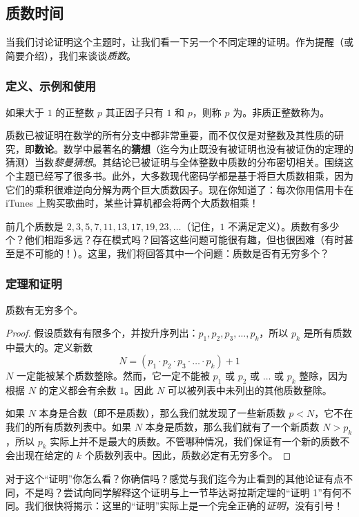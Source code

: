 \subsection{质数时间}\label{sec:section1.1.2}

当我们讨论证明这个主题时，让我们看一下另一个不同定理的证明。作为提醒（或简要介绍），我们来谈谈\emph{质数}。

\subsubsection*{定义、示例和使用}

\begin{definition}\label{def:prime}
    如果大于 $1$ 的正整数 $p$ 其正因子只有 $1$ 和 $p$，则称 $p$ 为。非质正整数称为。
\end{definition}

质数已被证明在数学的所有分支中都非常重要，而不仅仅是对整数及其性质的研究，即\textbf{数论}。数学中最著名的\textbf{猜想}（迄今为止既没有被证明也没有被证伪的定理的猜测）当数\emph{黎曼猜想}。其结论已被证明与全体整数中质数的分布密切相关。围绕这个主题已经写了很多书。此外，大多数现代密码学都是基于将巨大质数相乘，因为它们的乘积很难逆向分解为两个巨大质数因子。现在你知道了：每次你用信用卡在 iTunes 上购买歌曲时，某些计算机都会将两个大质数相乘！

前几个质数是 $2, 3, 5, 7, 11, 13, 17, 19, 23,\dots$（记住，$1$ 不满足定义）。质数有多少个？他们相距多远？存在模式吗？回答这些问题可能很有趣，但也很困难（有时甚至是不可能的！）。这里，我们将回答其中一个问题：质数是否有无穷多个？

\subsubsection*{定理和证明}

\begin{theorem}[质数无限性]
    质数有无穷多个。
\end{theorem}

\begin{proof}
    假设质数有有限多个，并按升序列出：$p_1, p_2, p_3, \dots, p_k$，所以 $p_k$ 是所有质数中最大的。定义新数
    \[N = (p_1 \cdot p_2 \cdot p_3 \cdot \dots \cdot p_k) + 1\]
    $N$ 一定能被某个质数整除。然而，它一定不能被 $p_1$ 或 $p_2$ 或 $\dots$ 或 $p_k$ 整除，因为根据 $N$ 的定义都会有余数 $1$。因此 $N$ 可以被列表中未列出的其他质数整除。

    如果 $N$ 本身是合数（即不是质数），那么我们就发现了一些新质数 $p < N$，它不在我们的所有质数列表中。如果 $N$ 本身是质数，那么我们就有了一个新质数 $N > p_k$，所以 $p_k$ 实际上并不是最大的质数。不管哪种情况，我们保证有一个新的质数不会出现在给定的 $k$ 个质数列表中。因此，质数必定有无穷多个。
\end{proof}

对于这个``证明''你怎么看？你确信吗？感觉与我们迄今为止看到的其他论证有点不同，不是吗？尝试向同学解释这个证明与上一节毕达哥拉斯定理的``证明 1''有何不同。我们很快将揭示：这里的``证明''实际上是一个完全正确的\emph{证明}，没有引号！
    